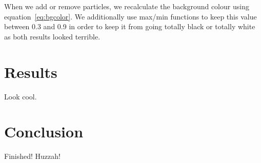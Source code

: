 \documentclass[conference]{acmsiggraph}
\begin{document}
When we add or remove particles, we recalculate the background colour using equation~\ref{eq:bgcolor}. We additionally use max/min functions to keep this value between 0.3 and 0.9 in order to keep it from going totally black or totally white as both results looked terrible.

\section{Results}
Look cool.

\section{Conclusion}
Finished! Huzzah!


\nocite{*}

\end{document}
